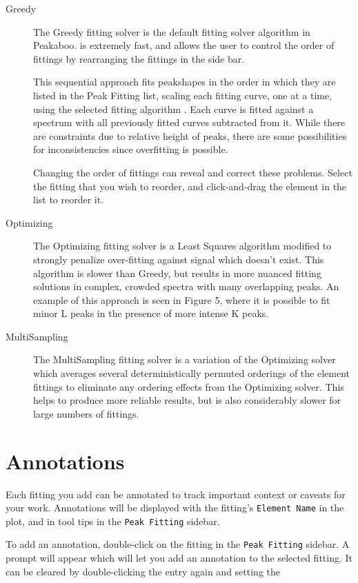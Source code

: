 \documentclass[article,twoside,11pt]{report}
\newcommand{\command}[1]{\texttt{#1}}
\newcommand{\tocsection}[1]{\section*{#1}\addcontentsline{toc}{section}{#1}}
\begin{document}
\begin{description}

\item [Greedy] The Greedy fitting solver is the default fitting solver algorithm in Peakaboo. is extremely fast, and allows the user to control the order of fittings by rearranging the fittings in the side bar. 

This sequential approach fits peakshapes in the order in which they are listed in the Peak Fitting list, scaling each fitting curve, one at a time, using the selected fitting algorithm . Each curve is fitted against a spectrum with all previously fitted curves subtracted from it. While there are constraints due to relative height of peaks, there are some possibilities for inconsistencies since overfitting is possible. 

Changing the order of fittings can reveal and correct these problems. Select the fitting that you wish to reorder, and click-and-drag the element in the list to reorder it.


\item [Optimizing] The Optimizing fitting solver is a Least Squares algorithm modified to strongly penalize over-fitting against signal which doesn't exist. This algorithm is slower than Greedy, but results in more nuanced fitting solutions in complex, crowded spectra with many overlapping peaks. An example of this approach is seen in Figure 5, where it is possible to fit minor L peaks in the presence of more intense K peaks.

\item [MultiSampling] The MultiSampling fitting solver is a variation of the Optimizing solver which averages several deterministically permuted orderings of the element fittings to eliminate any ordering effects from the Optimizing solver. This helps to produce more reliable results, but is also considerably slower for large numbers of fittings.

\end{description}

\tocsection{Annotations}

Each fitting you add can be annotated to track important context or caveats for your work. Annotations will be displayed with the fitting's \command{Element Name} in the plot, and in tool tips in the \command{Peak Fitting} sidebar.

To add an annotation, double-click on the fitting in the \command{Peak Fitting} sidebar. A prompt will appear which will let you add an annotation to the selected fitting. It can be cleared by double-clicking the entry again and setting the
\end{document}
